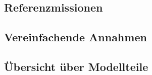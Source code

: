 \subsection{Referenzmissionen}
	

\subsection{Vereinfachende Annahmen}

\subsection{Übersicht über Modellteile}
	
	
	

